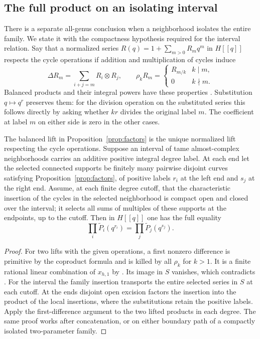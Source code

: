 \subsection*{The full product on an isolating interval}
There is a separate all-genus conclusion when a neighborhood isolates
the entire family. We state it with the compactness hypothesis
required for the interval relation. Say that a normalized series
$R(q)=1+\sum_{m>0}R_mq^m$ in $H[[q]]$ respects the cycle operations
if addition and multiplication of cycles induce
\[
 \Delta R_m=\sum_{i+j=m}R_i\otimes R_j,\qquad
 \rho_k R_m=\begin{cases}R_{m/k}&k\mid m,\\0&k\nmid m.\end{cases}
\]
Balanced products and their integral powers have these properties
\cite[\S7]{WueProduct}. Substitution $q\mapsto q^r$ preserves them:
for the division operation on the substituted series this follows
directly by asking whether $kr$ divides the original label $m$.
The coefficient at label $m$ on either side is zero in the other
cases.

\begin{proposition}\label{prop:full-transport}
The balanced lift in Proposition~\ref{prop:factors} is the unique
normalized lift respecting the cycle operations. Suppose an interval
of tame almost-complex neighborhoods carries an additive positive
integral degree label. At each end let the selected connected supports
be finitely many pairwise disjoint curves satisfying
Proposition~\ref{prop:factors}, of positive labels $r_i$ at the left
end and $s_j$ at the right end. Assume, at each finite degree cutoff,
that the characteristic insertion of the cycles in the selected
neighborhood is compact open and closed over the interval; it selects
all sums of multiples of these supports at the endpoints, up to the
cutoff. Then in $H[[q]]$ one has the full equality
\[
        \prod_i \widetilde P_i(q^{r_i})
        =\prod_j \widetilde P_j(q^{s_j}).
\]
\end{proposition}

\begin{proof}
For two lifts with the given operations, a first nonzero difference
is primitive by the coproduct formula and is killed by all
$\rho_k$ for $k>1$. It is a finite rational linear combination
of $x_{h,1}$ by \cite[Lemma~7.1]{WueProduct}. Its image in $S$ vanishes,
which contradicts \cite[Theorem~5.1]{WueProduct}.
For the interval the family insertion transports the entire selected
series in $S$ at each cutoff. At the ends disjoint open excision
factors the insertion into the product of the local insertions,
where the substitutions retain the positive labels. Apply the
first-difference argument to the two lifted products in each
degree. The same proof works after concatenation, or on either
boundary path of a compactly isolated two-parameter family.
\end{proof}

